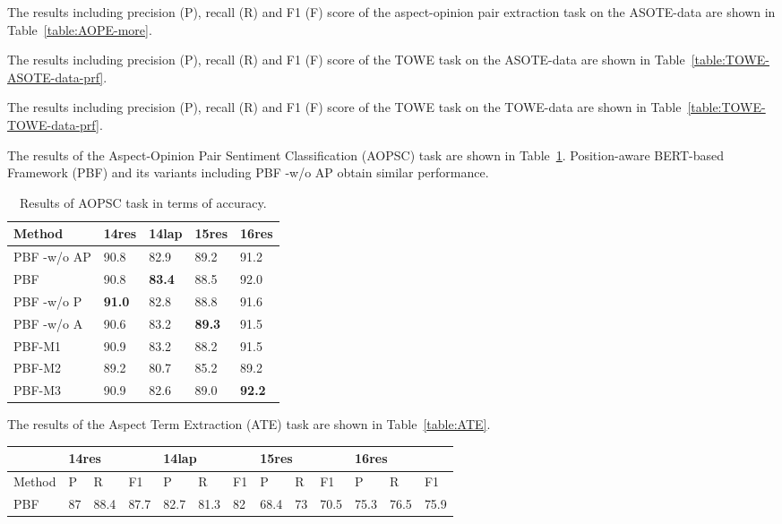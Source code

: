 \documentclass[11pt]{article}
\begin{document}
The results including precision (P), recall (R) and F1 (F) score of the aspect-opinion pair extraction task  on the ASOTE-data are shown in Table~\ref{table:AOPE-more}.

The results including precision (P), recall (R) and F1 (F) score of the TOWE task  on the ASOTE-data are shown in Table~\ref{table:TOWE-ASOTE-data-prf}.

The results including precision (P), recall (R) and F1 (F) score of the TOWE task  on the TOWE-data are shown in Table~\ref{table:TOWE-TOWE-data-prf}.

The results of the Aspect-Opinion Pair Sentiment Classification (AOPSC) task are shown in Table~\ref{table:AOPSC}. Position-aware BERT-based Framework (PBF) and its variants including PBF -w/o AP obtain similar performance. 

\begin{table}
	\centering
	\begin{tabular}{|l|l|l|l|l|}
		\hline
		Method        & 14res       & 14lap         & 15res         & 16res         \\ \hline
		PBF -w/o AP   & 90.8        & 82.9          & 89.2          & 91.2          \\ \hline
		PBF           & 90.8        & \textbf{83.4} & 88.5          & 92.0            \\ \hline
		PBF -w/o P    & \textbf{91.0} & 82.8          & 88.8          & 91.6          \\ \hline
		PBF -w/o A & 90.6        & 83.2          & \textbf{89.3} & 91.5          \\ \hline
		PBF-M1     & 90.9        & 83.2          & 88.2          & 91.5          \\ \hline
		PBF-M2     & 89.2        & 80.7          & 85.2          & 89.2          \\ \hline
		PBF-M3        & 90.9        & 82.6          & 89.0            & \textbf{92.2} \\ \hline
	\end{tabular}
	\caption{\label{table:AOPSC} Results of AOPSC task in terms of accuracy.}
\end{table}

The results of the Aspect Term Extraction (ATE) task are shown in Table~\ref{table:ATE}.
\begin{table*}
	\centering
	\begin{tabular}{|l|l|l|l|l|l|l|l|l|l|l|l|l|}
		\hline
		& \multicolumn{3}{l|}{14res} & \multicolumn{3}{l|}{14lap} & \multicolumn{3}{l|}{15res} & \multicolumn{3}{l|}{16res} \\ \hline
		Method & P      & R       & F1      & P        & R       & F1    & P        & R     & F1      & P       & R       & F1     \\ \hline
		PBF    & 87     & 88.4    & 87.7    & 82.7     & 81.3    & 82    & 68.4     & 73    & 70.5    & 75.3    & 76.5    & 75.9   \\ \hline
	\end{tabular}
	\caption{\label{table:ATE} Results of the Aspect Term Extraction (ATE) task.}
\end{table*}
\end{document}
